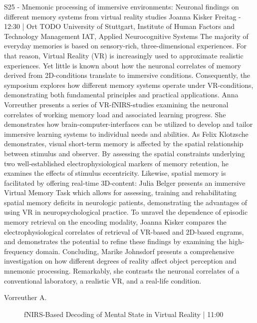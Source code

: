 
            \begin{symposium}
            {S25 - Mnemonic processing of immersive environments: Neuronal findings on different memory systems from virtual reality studies }
            { Joanna Kisker }
            {Freitag  - 12:30 | Ort TODO}
            {University of Stuttgart, Institute of Human Factors and Technology Management IAT, Applied Neurocognitive Systems}
            The majority of everyday memories is based on sensory-rich, three-dimensional experiences. For that reason, Virtual Reality (VR) is increasingly used to approximate realistic experiences. Yet little is known about how the neuronal correlates of memory derived from 2D-conditions translate to immersive conditions. Consequently, the symposium explores how different memory systems operate under VR-conditions, demonstrating both fundamental principles and practical applications. 
Anna Vorreuther presents a series of VR-fNIRS-studies examining the neuronal correlates of working memory load and associated learning progress. She demonstrates how brain-computer-interfaces can be utilized to develop and tailor immersive learning systems to individual needs and abilities. 
As Felix Klotzsche demonstrates, visual short-term memory is affected by the spatial relationship between stimulus and observer. By assessing the spatial constraints underlying two well-established electrophysiological markers of memory retention, he examines the effects of stimulus eccentricity. 
Likewise, spatial memory is facilitated by offering real-time 3D-content: Julia Belger presents an immersive Virtual Memory Task which allows for assessing, training and rehabilitating spatial memory deficits in neurologic patients, demonstrating the advantages of using VR in neuropsychological practice.
To unravel the dependence of episodic memory retrieval on the encoding modality, Joanna Kisker compares the electrophysiological correlates of retrieval of VR-based and 2D-based engrams, and demonstrates the potential to refine these findings by examining the high-frequency domain.
Concluding, Marike Johnsdorf presents a comprehensive investigation on how different degrees of reality affect object perception and mnemonic processing. Remarkably, she contrasts the neuronal correlates of a conventional laboratory, a realistic VR, and a real-life condition.
            \begin{description}    
            
                \item [ Vorreuther A.] fNIRS-Based Decoding of Mental State in Virtual Reality \textcolor{mygray}{ | 11:00}    
                

\end{description}
\end{symposium}
